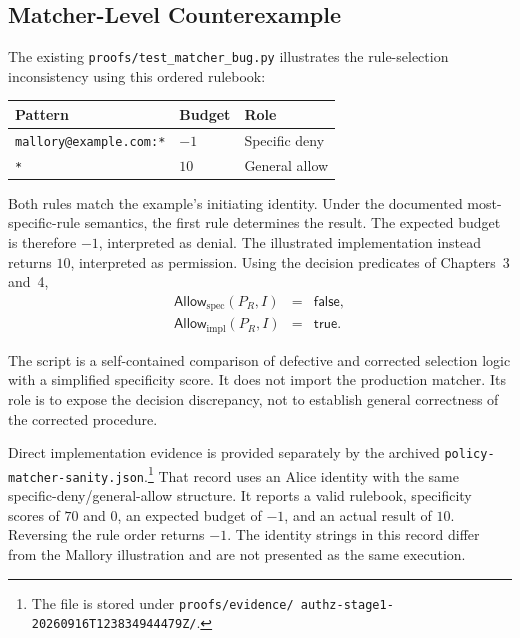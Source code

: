 
\subsection{Matcher-Level Counterexample}

The existing \texttt{proofs/test\_matcher\_bug.py} illustrates the rule-selection
inconsistency using this ordered rulebook:
\begin{center}
\begin{tabular}{lll}
\hline
Pattern & Budget & Role \\
\hline
\texttt{mallory@example.com:*} & $-1$ & Specific deny \\
\texttt{*} & $10$ & General allow \\
\hline
\end{tabular}
\end{center}
Both rules match the example's initiating identity. Under the documented
most-specific-rule semantics, the first rule determines the result. The
expected budget is therefore $-1$, interpreted as denial. The illustrated
implementation instead returns $10$, interpreted as permission. Using the
decision predicates of Chapters~3 and~4,
\[
\begin{array}{rcl}
\mathsf{Allow}_{\mathrm{spec}}(P_R,I) &=& \mathsf{false}, \\
\mathsf{Allow}_{\mathrm{impl}}(P_R,I) &=& \mathsf{true}.
\end{array}
\]

The script is a self-contained comparison of defective and corrected
selection logic with a simplified specificity score. It does not import the
production matcher. Its role is to expose the decision discrepancy, not to
establish general correctness of the corrected procedure.

Direct implementation evidence is provided separately by the archived
\texttt{policy-matcher-sanity.json}.\footnote{The file is stored under
\texttt{proofs/\allowbreak evidence/\allowbreak
authz-stage1-\allowbreak 20260916T123834944479Z/}.}
That record uses an Alice identity with the same specific-deny/general-allow
structure. It reports a valid rulebook, specificity scores of $70$ and $0$,
an expected budget of $-1$, and an actual result of $10$. Reversing the rule
order returns $-1$. The identity strings in this record differ from the
Mallory illustration and are not presented as the same execution.

